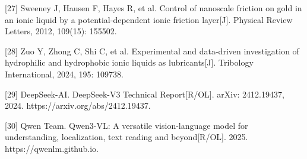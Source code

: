 {[}27{]} Sweeney J, Hausen F, Hayes R, et al. Control of nanoscale friction on gold in an ionic liquid by a potential-dependent ionic friction layer{[}J{]}. Physical Review Letters, 2012, 109(15): 155502.

{[}28{]} Zuo Y, Zhong C, Shi C, et al. Experimental and data-driven investigation of hydrophilic and hydrophobic ionic liquids as lubricants{[}J{]}. Tribology International, 2024, 195: 109738.

{[}29{]} DeepSeek-AI. DeepSeek-V3 Technical Report{[}R/OL{]}. arXiv: 2412.19437, 2024. https://arxiv.org/abs/2412.19437.

{[}30{]} Qwen Team. Qwen3-VL: A versatile vision-language model for understanding, localization, text reading and beyond{[}R/OL{]}. 2025. https://qwenlm.github.io.
